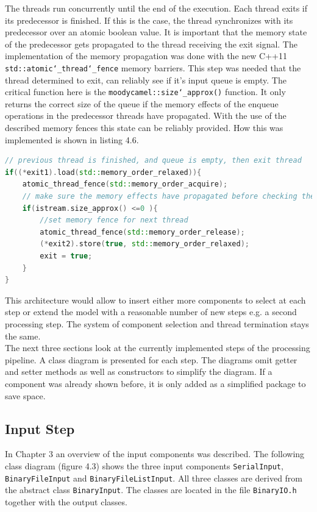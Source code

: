 The threads run concurrently until the end of the execution. Each thread exits if its predecessor is finished. If this is the case, the thread synchronizes with its predecessor over an atomic boolean value. It is important that the memory state of the predecessor gets propagated to the thread receiving the exit signal. The implementation of the memory propagation was done with the new C++11 \texttt{std::atomic\char`_thread\char`_fence} memory barriers. This step was needed that the thread determined to exit, can reliably see if it's input queue is empty. The critical function here is the \texttt{moodycamel::size\char`_approx()} function. It only returns the correct size of the queue if the memory effects of the enqueue operations in the predecessor threads have propagated. With the use of the described memory fences this state can be reliably provided. How this was implemented is shown in listing 4.6.
\begin{lstlisting}[language=C++, caption=Code snippet highlighting the memory barriers.]
// previous thread is finished, and queue is empty, then exit thread
if((*exit1).load(std::memory_order_relaxed)){
    atomic_thread_fence(std::memory_order_acquire);
    // make sure the memory effects have propagated before checking the size
    if(istream.size_approx() <=0 ){
        //set memory fence for next thread
        atomic_thread_fence(std::memory_order_release);
        (*exit2).store(true, std::memory_order_relaxed);
        exit = true;
    }
}
\end{lstlisting}

This architecture would allow to insert either more components to select at each step or extend the model with a reasonable number of new steps e.g. a second processing step. The system of component selection and thread termination stays the same.\\
The next three sections look at the currently implemented steps of the processing pipeline. A class diagram is presented for each step. The diagrams omit getter and setter methods as well as constructors to simplify the diagram. If a component was already shown before, it is only added as a simplified package to save space.
\subsection{Input Step}
In Chapter 3 an overview of the input components was described. The following class diagram (figure 4.3) shows the three input components \texttt{SerialInput}, \texttt{BinaryFileInput} and \texttt{BinaryFileListInput}. All three classes are derived from the abstract class \texttt{BinaryInput}. The classes are located in the file \texttt{BinaryIO.h} together with the output classes.


